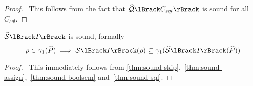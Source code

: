 \begin{proof}
    \pf\
    This follows from the fact that $\abssqlsem{C_{sql}}$ is sound for all $C_{sql}$.
\end{proof}


\begin{conjecture}
    $\abssem{I}$ is sound, formally
    \begin{equation*}
        \environment \in \concrete_1(\ab{P}) \implies \sem{I}(\environment) \subseteq \concrete_1(\abssem{I}(\ab{P}))
    \end{equation*}
\end{conjecture}


\begin{proof}
    \pf\
    This immediately follows from \autoref{thm:sound-skip},~\ref{thm:sound-assign},~\ref{thm:sound-boolsem} and~\ref{thm:sound-sql}.
\end{proof}
